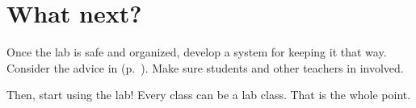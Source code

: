 \section{What next?}

Once the lab is safe and organized, 
develop a system for keeping it that way. 
Consider the advice in  (p.~\pageref{cha:routineup}). 
Make sure students and other teachers in involved.

Then, 
start using the lab! Every class can be a lab class. 
That is the whole point.
